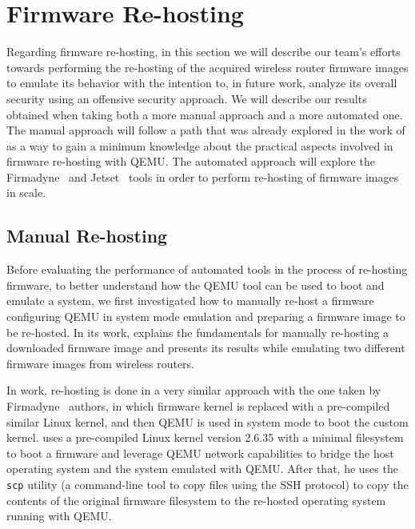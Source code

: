 \section{Firmware Re-hosting}

Regarding firmware re-hosting, in this section we will describe our team's efforts towards performing the re-hosting of the acquired wireless router firmware images to emulate its behavior with the intention to, in future work, analyze its overall security using an offensive security approach. We will describe our results obtained when taking both a more manual approach and a more automated one. The manual approach will follow a path that was already explored in the work of \cite{victor-sales} as a way to gain a minimum knowledge about the practical aspects involved in firmware re-hosting with QEMU. The automated approach will explore the Firmadyne~\cite{firmadyne} and Jetset~\cite{jetset} tools in order to perform re-hosting of firmware images in scale.

\subsection{Manual Re-hosting}
\label{sec:manual-rehosting}

Before evaluating the performance of automated tools in the process of re-hosting firmware, to better understand how the QEMU tool can be used to boot and emulate a system, we first investigated how to manually re-host a firmware configuring QEMU in system mode emulation and preparing a firmware image to be re-hosted. In its work, \cite{victor-sales} explains the fundamentals for manually re-hosting a downloaded firmware image and presents its results while emulating two different firmware images from wireless routers.

In \cite{victor-sales} work, re-hosting is done in a very similar approach with the one taken by Firmadyne~\cite{firmadyne} authors, in which firmware kernel is replaced with a pre-compiled similar Linux kernel, and then QEMU is used in system mode to boot the custom kernel. \cite{victor-sales} uses a pre-compiled Linux kernel version 2.6.35 with a minimal filesystem to boot a firmware and leverage QEMU network capabilities to bridge the host operating system and the system emulated with QEMU. After that, he uses the {\tt scp} utility (a command-line tool to copy files using the SSH protocol) to copy the contents of the original firmware filesystem to the re-hosted operating system running with QEMU.

